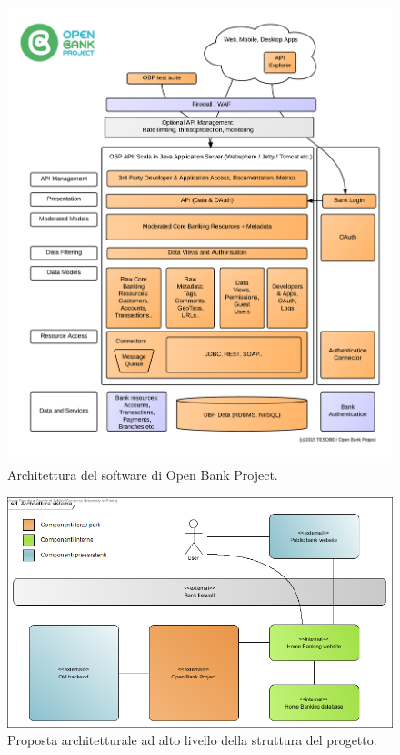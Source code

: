 \documentclass[10pt]{softeng} %
\begin{document}
\graphicspath{{Images/}}
\begin{figure}[tp]
	\centering
	\includegraphics[width=\textwidth]{open_bank_project_architecture}
	\caption{Architettura del software di Open Bank Project\cite{obparch}.}
	\label{fig:open_bank_project_architecture}
\end{figure}

\begin{figure}[hbt]
	\centering
	\includegraphics[width=\textwidth]{architettura_sistema}
	\caption{Proposta architetturale ad alto livello della struttura del progetto.}
	\label{fig:project_structure}
\end{figure}
\end{document}
